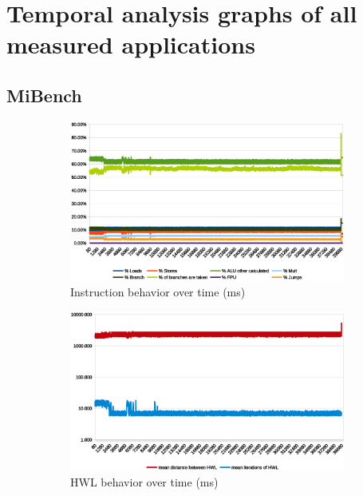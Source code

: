 \documentclass[../bachelor_paper.tex]{subfiles}
\begin{document}
\chapter{Temporal analysis graphs of all measured applications}
    \label{ch:graphs}
\section{MiBench}

\begin{figure}
    \begin{subfigure}{0.45\textwidth}
        \includegraphics[width=\textwidth]{img/graph/mibench/basicmath_inst.eps}
        \caption{Instruction behavior over time (ms)}
    \end{subfigure}
    \begin{subfigure}{0.45\textwidth}
        \includegraphics[width=\textwidth]{img/graph/mibench/basicmath_hwl.eps}
        \caption{\ac{HWL} behavior over time (ms)}
    \end{subfigure}
    \begin{subfigure}{0.45\textwidth}

\end{subfigure}
\end{figure}
\end{document}
